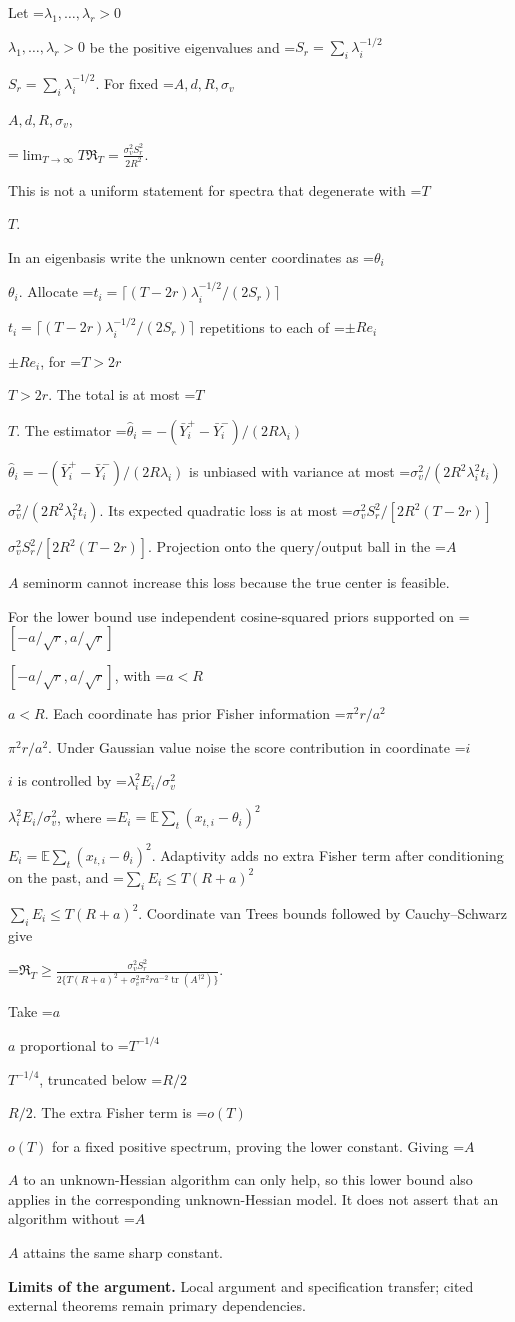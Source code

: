\documentclass[10pt,a4paper]{article}
\newcommand{\AtlasMath}[1]{\par\begingroup\centering\setbox0=\hbox{$\displaystyle #1$}\ifdim\wd0>1.4\linewidth\typeout{ATLAS WIDE FORMULA: \the\wd0}\fi\ifdim\wd0>\linewidth\resizebox{\linewidth}{!}{\box0}\else\box0\fi\par\endgroup}
\newcommand{\AtlasInlineMath}[1]{\begingroup\setbox0=\hbox{$#1$}\ifdim\wd0>.4\linewidth\endgroup\AtlasMath{#1}\else\endgroup$#1$\fi}
\begin{document}
Let \AtlasInlineMath{\lambda_1,\ldots,\lambda_r>0} be the positive eigenvalues and \AtlasInlineMath{S_r=\sum_i\lambda_i^{-1/2}}. For fixed \AtlasInlineMath{A,d,R,\sigma_v},

\AtlasMath{\lim_{T\to\infty}T\mathfrak R_T=\frac{\sigma_v^2S_r^2}{2R^2}.}

This is not a uniform statement for spectra that degenerate with \AtlasInlineMath{T}.

In an eigenbasis write the unknown center coordinates as \AtlasInlineMath{\theta_i}. Allocate \AtlasInlineMath{t_i=\lceil(T-2r)\lambda_i^{-1/2}/(2S_r)\rceil} repetitions to each of \AtlasInlineMath{\pm Re_i}, for \AtlasInlineMath{T>2r}. The total is at most \AtlasInlineMath{T}. The estimator \AtlasInlineMath{\widehat\theta_i=-(\bar Y_i^+-\bar Y_i^-)/(2R\lambda_i)} is unbiased with variance at most \AtlasInlineMath{\sigma_v^2/(2R^2\lambda_i^2t_i)}. Its expected quadratic loss is at most \AtlasInlineMath{\sigma_v^2S_r^2/[2R^2(T-2r)]}. Projection onto the query/output ball in the \AtlasInlineMath{A} seminorm cannot increase this loss because the true center is feasible.

For the lower bound use independent cosine-squared priors supported on \AtlasInlineMath{[-a/\sqrt r,a/\sqrt r]}, with \AtlasInlineMath{a<R}. Each coordinate has prior Fisher information \AtlasInlineMath{\pi^2r/a^2}. Under Gaussian value noise the score contribution in coordinate \AtlasInlineMath{i} is controlled by \AtlasInlineMath{\lambda_i^2 E_i/\sigma_v^2}, where \AtlasInlineMath{E_i=\mathbb E\sum_t(x_{t,i}-\theta_i)^2}. Adaptivity adds no extra Fisher term after conditioning on the past, and \AtlasInlineMath{\sum_iE_i\le T(R+a)^2}. Coordinate van Trees bounds followed by Cauchy--Schwarz give

\AtlasMath{\mathfrak R_T\ge\frac{\sigma_v^2S_r^2}{2\{T(R+a)^2+\sigma_v^2\pi^2r a^{-2}\operatorname{tr}(A^{\dagger2})\}}.}

Take \AtlasInlineMath{a} proportional to \AtlasInlineMath{T^{-1/4}}, truncated below \AtlasInlineMath{R/2}. The extra Fisher term is \AtlasInlineMath{o(T)} for a fixed positive spectrum, proving the lower constant. Giving \AtlasInlineMath{A} to an unknown-Hessian algorithm can only help, so this lower bound also applies in the corresponding unknown-Hessian model. It does not assert that an algorithm without \AtlasInlineMath{A} attains the same sharp constant.

\textbf{Limits of the argument.} Local argument and specification transfer; cited external theorems remain primary dependencies.
\end{document}
